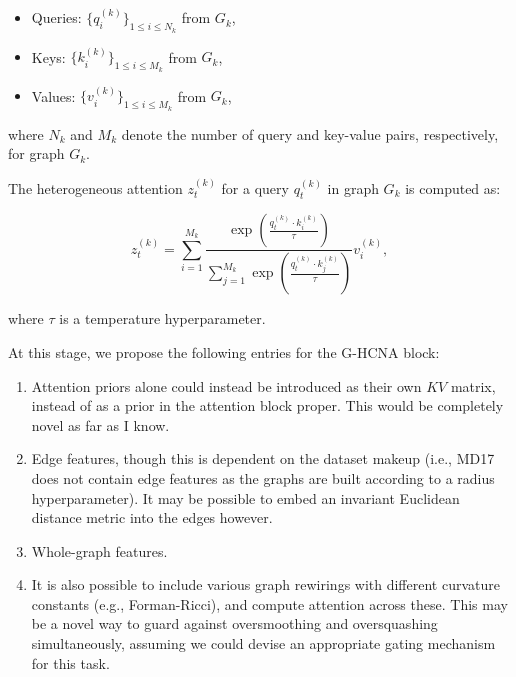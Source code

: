 \documentclass{article}
\begin{document}
\begin{itemize}
    \item Queries: \( \{q^{(k)}_i\}_{1 \leq i \leq N_k} \) from \( G_k \),
    \item Keys: \( \{k^{(k)}_i\}_{1 \leq i \leq M_k} \) from \( G_k \),
    \item Values: \( \{v^{(k)}_i\}_{1 \leq i \leq M_k} \) from \( G_k \),
\end{itemize}

where \( N_k \) and \( M_k \) denote the number of query and key-value pairs, respectively, for graph \( G_k \).

The heterogeneous attention \( z_t^{(k)} \) for a query \( q_t^{(k)} \) in graph \( G_k \) is computed as:

\[
z_t^{(k)} = \sum_{i=1}^{M_k} \frac{\exp\left(\frac{q_t^{(k)} \cdot k_i^{(k)}}{\tau}\right)}{\sum_{j=1}^{M_k} \exp\left(\frac{q_t^{(k)} \cdot k_j^{(k)}}{\tau}\right)} v_i^{(k)},
\]

where \( \tau \) is a temperature hyperparameter.

At this stage, we propose the following entries for the G-HCNA block:
\begin{enumerate}
    \item Attention priors alone could instead be introduced as their own $KV$ matrix, instead of as a prior in the attention block proper. This would be completely novel as far as I know. 
    \item Edge features, though this is dependent on the dataset makeup (i.e., MD17 does not contain edge features as the graphs are built according to a radius hyperparameter). It may be possible to embed an invariant Euclidean distance metric into the edges however.
    \item Whole-graph features. 
    \item It is also possible to include various graph rewirings with different curvature constants (e.g., Forman-Ricci), and compute attention across these. This may be a novel way to guard against oversmoothing and oversquashing simultaneously, assuming we could devise an appropriate gating mechanism for this task.
\end{enumerate}
\end{document}
